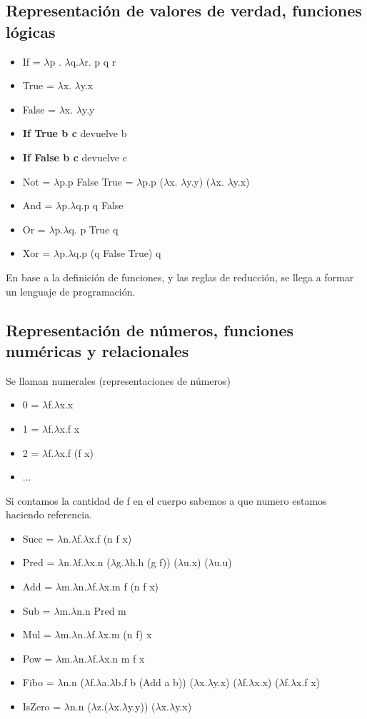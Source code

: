 \subsection*{Representación de valores de verdad, funciones lógicas}

\begin{itemize}
\item If = $\lambda$p . $\lambda$q.$\lambda$r. p q r
\item True = $\lambda$x. $\lambda$y.x
\item False = $\lambda$x. $\lambda$y.y
\item \textbf{If True b c} devuelve b
\item \textbf{If False b c} devuelve c
\item Not =  $\lambda$p.p False True =  $\lambda$p.p ($\lambda$x. $\lambda$y.y) ($\lambda$x. $\lambda$y.x)
\item And = $\lambda$p.$\lambda$q.p q False
\item Or = $\lambda$p.$\lambda$q. p True q
\item Xor = $\lambda$p.$\lambda$q.p (q False True) q
\end{itemize}

En base a la definición de funciones, y las reglas de reducción, se llega a formar un lenguaje de programación.

\subsection*{Representación de números, funciones numéricas y relacionales}
Se llaman numerales (representaciones de números)

\begin{itemize}
\item 0 = $\lambda$f.$\lambda$x.x
\item 1 = $\lambda$f.$\lambda$x.f x
\item 2 = $\lambda$f.$\lambda$x.f (f x)
\item ...
\end{itemize}
Si contamos la cantidad de f en el cuerpo sabemos a que numero estamos haciendo referencia.


\begin{itemize}
\item Succ = $\lambda$n.$\lambda$f.$\lambda$x.f (n f x)
\item Pred = $\lambda$n.$\lambda$f.$\lambda$x.n ($\lambda$g.$\lambda$h.h (g f)) ($\lambda$u.x) ($\lambda$u.u)
\item Add = $\lambda$m.$\lambda$n.$\lambda$f.$\lambda$x.m f (n f x)
\item Sub = $\lambda$m.$\lambda$n.n Pred m
\item Mul = $\lambda$m.$\lambda$n.$\lambda$f.$\lambda$x.m (n f) x
\item Pow = $\lambda$m.$\lambda$n.$\lambda$f.$\lambda$x.n m f x 
\item Fibo = $\lambda$n.n ($\lambda$f.$\lambda$a.$\lambda$b.f b (Add a b)) ($\lambda$x.$\lambda$y.x) ($\lambda$f.$\lambda$x.x) ($\lambda$f.$\lambda$x.f x) 
\item IsZero = $\lambda$n.n ($\lambda$z.($\lambda$x.$\lambda$y.y)) ($\lambda$x.$\lambda$y.x)
\end{itemize}

